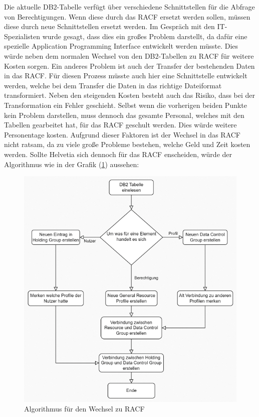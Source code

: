Die aktuelle DB$2$-Tabelle verfügt über verschiedene Schnittstellen für die Abfrage von Berechtigungen.
Wenn diese durch das \ac{RACF} ersetzt werden sollen, müssen diese durch neue Schnittstellen ersetzt werden.
Im Gespräch mit den IT-Spezialisten wurde gesagt, dass dies ein großes Problem darstellt, da dafür eine spezielle Application Programming Interface entwickelt werden müsste.
Dies würde neben dem normalen Wechsel von den DB$2$-Tabellen zu \ac{RACF} für weitere Kosten sorgen.
\newline
Ein anderes Problem ist auch der Transfer der bestehenden Daten in das \ac{RACF}.
Für diesen Prozess müsste auch hier eine Schnittstelle entwickelt werden, welche bei dem Transfer die Daten in das richtige Dateiformat transformiert.
Neben den steigenden Kosten besteht auch das Risiko, dass bei der Transformation ein Fehler geschieht.
\newline
Selbst wenn die vorherigen beiden Punkte kein Problem darstellen, muss dennoch das gesamte Personal, welches mit den Tabellen gearbeitet hat, für das \ac{RACF} geschult werden.
Dies würde weitere Personentage kosten.
Aufgrund dieser Faktoren ist der Wechsel in das \ac{RACF} nicht ratsam, da zu viele große Probleme bestehen, welche Geld und Zeit kosten werden.
\newline
Sollte Helvetia sich dennoch für das \ac{RACF} enscheiden, würde der Algorithmus wie in der Grafik (\ref{fig:racf}) aussehen:
\begin{figure}[h!]
 \centering
 \includegraphics[width=1\textwidth]{gfx/Picture/racf.PNG}
 \caption{Algorithmus für den Wechsel zu RACF}
 \label{fig:racf}
\end{figure}